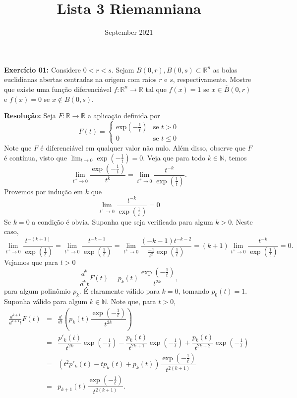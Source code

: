 \documentclass[twoside,openright,titlepage,numbers=noenddot,headinclude,  lineheaders footinclude=true,cleardoublepage=empty,BCOR=5mm,paper=a4,fontsize=12pt ]{scrbook}
\title{Lista 3 Riemanniana}
\author{}
\date{September 2021}
\begin{document}
\maketitle


\textbf{Exercício 01:} 
Considere $0 < r < s$. 
Sejam $B(0,r), B(0,s)\subset \mathbb{R}^n$ as bolas euclidianas abertas centradas na origem com raios $r$ e $s$, respectivamente. 
Mostre que existe uma função diferenciável $f : \mathbb{R}^n \rightarrow \mathbb{R}$ tal que $f(x) = 1$ se $x \in \overline{B}(0,r)$ e $ f(x) = 0 $ se $ x \notin B(0,s)$.
\vspace{0.5cm}

\textbf{Resolução:} 
Seja $F: \mathbb{R} \rightarrow \mathbb{R} $ a aplicação definida por
\[
    F(t) = \begin{cases}
                \text{exp}{\left(-\frac{1}{t}\right)} & \text{se } t > 0 \\
                0  & \text{se } t \leq 0
            \end{cases}
\]
Note que $ F $ é diferenciável em qualquer valor não nulo. 
Além disso, observe que $F$ é contínua, visto que $\lim _{t \to 0} \exp{\left(-\frac{1}{t}\right)} = 0$. 
Veja que para todo $k \in \mathbb{N}$, temos
\[
    \lim _{t^+ \to 0}\dfrac{\exp\left( -\frac{1}{t}\right)}{t^k} = \lim_{t^+ \to 0} \dfrac{t^{-k}}{\exp\left( \frac{1}{t}\right)}.
\]
Provemos por indução em $k$ que
\begin{equation}\label{equation:eq1}
    \lim _{t^+ \to 0}\dfrac{t^{-k}}{\exp\left( \frac{1}{t}\right)} = 0
\end{equation}
Se $k=0$ a condição é obvia. 
Suponha que seja verificada para algum $k >0$. Neste caso,
\[
    \lim _{t^+ \to 0} \dfrac{t^{- (k+1)}}{\exp\left( \frac{1}{t}\right)} 
    = \lim_{t^+ \to 0}   \dfrac{t^{- k - 1 }}{\exp\left( \frac{1}{t}\right)} 
    = \lim _{t^+ \to 0}  \dfrac{(-k-1)t^{- k - 2 }}{\frac{-1}{t^2}\exp\left( \frac{1}{t}\right)}
    =(k+1)\lim _{t^+ \to 0} \dfrac{t^{- k }}{\exp\left( \frac{1}{t}\right)}
    =0.
\]
Vejamos que para $t > 0 $
\[
    \frac{d^k}{d^k t} F(t) 
    = p_k (t) \dfrac{\exp\left(  -\frac{1}{t} \right)}{t^{2k}},  
\]
para algum polinômio $p_k$. 
É claramente válido para $ k = 0 $, tomando $p_0(t) = 1$. Suponha válido para algum $ k \in \mathbb{N}$. 
Note que, para $t>0$,
\[
    \begin{array}{rcl}
        \frac{d^{k+1}}{d^{k+1} t} F (t) &=& \frac{d}{d t} \left(p_k (t) \dfrac{\exp\left(  -\frac{1}{t} \right)}{t^{2k}}  \right) \\
        &=& \dfrac{p'_k (t)}{t^{2k}} \exp\left(  -\frac{1}{t} \right)  - \dfrac{p _ k(t)}{ t^{2k + 1} }\exp\left(  -\frac{1}{t} \right)  + \dfrac{p _ k(t)}{ t^{2k + 2} }\exp\left(  -\frac{1}{t} \right) \\
        &=& (t^2 p'_ k (t) - t p _k(t) + p_k (t)) \dfrac{\exp\left(  -\frac{1}{t} \right)}{t^{2(k+1)}}\\
        &=& p _{k+1} (t) \dfrac{\exp\left(  -\frac{1}{t} \right)}{t^{2(k+1)}}.
    \end{array}
\]
\end{document}

